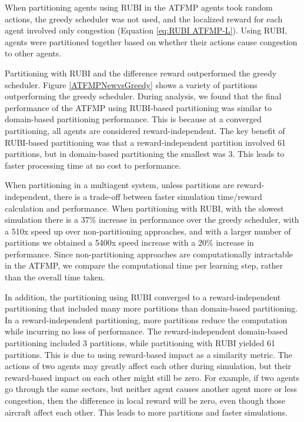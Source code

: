 \documentclass[letterpaper]{article}
\begin{document}
When partitioning agents using RUBI in the ATFMP agents took random actions, the greedy scheduler was not used, and the localized reward for each agent involved only congestion (Equation \ref{eq:RUBI ATFMP-L}). Using RUBI, agents were partitioned together based on whether their actions cause congestion to other agents. 

Partitioning with RUBI and the difference reward outperformed the greedy scheduler. Figure \ref{ATFMPNewvsGreedy} shows a variety of partitions outperforming the greedy scheduler. During analysis, we found that the final performance of the ATFMP using RUBI-based partitioning was similar to domain-based partitioning performance. This is because at a converged partitioning, all agents are considered reward-independent. The key benefit of RUBI-based partitioning was that a reward-independent partition involved 61 partitions, but in domain-based partitioning the smallest was 3. This leads to faster processing time at no cost to performance.

When partitioning in a multiagent system, unless partitions are reward-independent, there is a trade-off between faster simulation time/reward calculation and performance. When partitioning with RUBI, with the slowest simulation there is a 37\% increase in performance over the greedy scheduler, with a 510x speed up over non-partitioning approaches, and with a larger number of partitions we obtained a 5400x speed increase with a 20\% increase in performance. Since non-partitioning approaches are computationally intractable in the ATFMP, we compare the computational time per learning step, rather than the overall time taken.

In addition, the partitioning using RUBI converged to a reward-independent partitioning that included many more partitions than domain-based partitioning. In a reward-independent partitioning, more partitions reduce the computation while incurring no loss of performance. The reward-independent domain-based partitioning included 3 partitions, while partitioning with RUBI yielded 61 partitions. This is due to using reward-based impact as a similarity metric. The actions of two agents may greatly affect each other during simulation, but their reward-based impact on each other might still be zero. For example, if two agents go through the same sectors, but neither agent causes another agent more or less congestion, then the difference in local reward will be zero, even though those aircraft affect each other. This leads to more partitions and faster simulations. %
\end{document}
